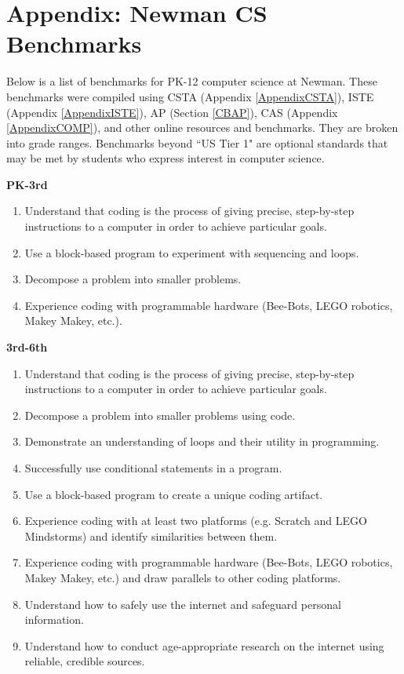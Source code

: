 \chapter{Appendix: Newman CS Benchmarks} %

\label{AppendixNEWMAN} %



Below is a list of benchmarks for PK-12 computer science at Newman. These benchmarks were compiled using CSTA (Appendix \ref{AppendixCSTA}), ISTE (Appendix \ref{AppendixISTE}), AP (Section \ref{CBAP}), CAS (Appendix \ref{AppendixCOMP}), and other online resources and benchmarks. They are broken into grade ranges. Benchmarks beyond ``US Tier 1" are optional standards that may be met by students who express interest in computer science. \par 

\textbf{PK-3rd}
\begin{enumerate}
	\item Understand that coding is the process of giving precise, step-by-step instructions to a computer in order to achieve particular goals.
	\item Use a block-based program to experiment with sequencing and loops.
	\item Decompose a problem into smaller problems.
	\item Experience coding with programmable hardware (Bee-Bots, LEGO robotics, Makey Makey, etc.).
\end{enumerate}

\textbf{3rd-6th}
\begin{enumerate}
	\item Understand that coding is the process of giving precise, step-by-step instructions to a computer in order to achieve particular goals.
	\item Decompose a problem into smaller problems using code.
	\item Demonstrate an understanding of loops and their utility in programming.
	\item Successfully use conditional statements in a program.
	\item Use a block-based program to create a unique coding artifact.
	\item Experience coding with at least two platforms (e.g. Scratch and LEGO Mindstorms) and identify similarities between them.
	\item Experience coding with programmable hardware (Bee-Bots, LEGO robotics, Makey Makey, etc.) and draw parallels to other coding platforms.
	\item Understand how to safely use the internet and safeguard personal information.
	\item Understand how to conduct age-appropriate research on the internet using reliable, credible sources.
\end{enumerate}

